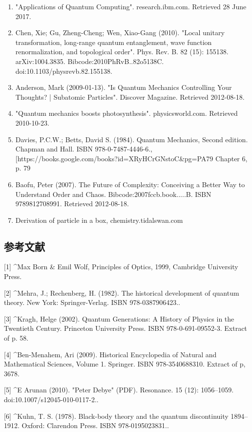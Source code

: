 \begin{enumerate}
\item "Applications of Quantum Computing". research.ibm.com. Retrieved 28 June 2017.
\item Chen, Xie; Gu, Zheng-Cheng; Wen, Xiao-Gang (2010). "Local unitary transformation, long-range quantum entanglement, wave function renormalization, and topological order". Phys. Rev. B. 82 (15): 155138. arXiv:1004.3835. Bibcode:2010PhRvB..82o5138C. doi:10.1103/physrevb.82.155138.
\item Anderson, Mark (2009-01-13). "Is Quantum Mechanics Controlling Your Thoughts? | Subatomic Particles". Discover Magazine. Retrieved 2012-08-18.
\item "Quantum mechanics boosts photosynthesis". physicsworld.com. Retrieved 2010-10-23.
\item Davies, P.C.W.; Betts, David S. (1984). Quantum Mechanics, Second edition. Chapman and Hall. ISBN 978-0-7487-4446-6., [https://books.google.com/books?id=XRyHCrGNstoC&pg=PA79 Chapter 6, p. 79
\item Baofu, Peter (2007). The Future of Complexity: Conceiving a Better Way to Understand Order and Chaos. Bibcode:2007fccb.book.....B. ISBN 9789812708991. Retrieved 2012-08-18.
\item Derivation of particle in a box, chemistry.tidalswan.com
\end{enumerate}

\subsection{参考文献}
[1]
^Max Born & Emil Wolf, Principles of Optics, 1999, Cambridge University Press.

[2]
^Mehra, J.; Rechenberg, H. (1982). The historical development of quantum theory. New York: Springer-Verlag. ISBN 978-0387906423..

[3]
^Kragh, Helge (2002). Quantum Generations: A History of Physics in the Twentieth Century. Princeton University Press. ISBN 978-0-691-09552-3. Extract of p. 58.

[4]
^Ben-Menahem, Ari (2009). Historical Encyclopedia of Natural and Mathematical Sciences, Volume 1. Springer. ISBN 978-3540688310. Extract of p, 3678.

[5]
^E Arunan (2010). "Peter Debye" (PDF). Resonance. 15 (12): 1056–1059. doi:10.1007/s12045-010-0117-2..

[6]
^Kuhn, T. S. (1978). Black-body theory and the quantum discontinuity 1894–1912. Oxford: Clarendon Press. ISBN 978-0195023831..


